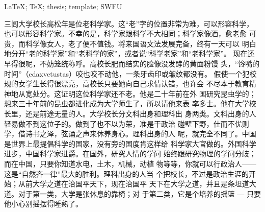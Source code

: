 \documentclass{swfuthesis}
\begin{document}
\begin{EKeyword} %
  \LaTeX{}; \TeX{}; thesis; template; SWFU
\end{EKeyword}

\vspace*{-60pt}
\tableofcontents %
\clearpage
\listoffigures %
\clearpage
\listoftables  %

\mainmatter






\appendix %

\makebib %

\begin{advisorInfo} %
  三闾大学校长高松年是位老科学家。这“老”字的位置非常为难，可以形容科学，
  也可以形容科学家。不幸的是，科学家跟科学不大相同；科学家像酒，愈老愈
  可贵，而科学像女人，老了便不值钱。将来国语文法发展完备，终有一天可以
  明白地分开“老的科学家”和“老科学的家”，或者说“科学老家”和“老科学家”。
  现在还早得很呢，不妨笼统称呼。高校长肥而结实的脸像没发酵的黄面粉馒
  头，“馋嘴的时间”（edaxvetustas）咬也咬不动他，一条牙齿印或皱纹都没有。
  假使一个犯校规的女学生长得很漂亮，高校长只要她向自己求情认错，也许会
  不尽本于教育精神地从宽处分。这证明这位科学家还不老。他是二十年前在外
  国研究昆虫学的；想来三十年前的昆虫都进化成为大学师生了，所以请他来表
  率多士。他在大学校长里，还是前途无量的人。大学校长分文科出身和理科出
  身两类。文科出身的人轻易做不到这位子的。做到了也不以为荣，准是干政治
  碰壁下野，仕而不优则学，借诗书之泽，弦诵之声来休养身心。理科出身的人
  呢，就完全不同了。中国是世界上最提倡科学的国家，没有旁的国度肯这样给
  科学家大官做的。外国科学进步，中国科学家进爵。在国外，研究人情的学问
  始终跟研究物理的学问分歧；而在中国，只要你知道水电，土木，机械，动植
  物等等，你就可以行政治人——这是“自然齐一律”最大的胜利。理科出身的人当
  个把校长，不过是政治生涯的开始；从前大学之道在治国平天下，现在治国平
  天下在大学之道，并且是条坦道大道。对于第一类，大学是张休息的靠椅；对
  于第二类，它是个培养的摇篮 --- 只要他小心别摇摆得睡熟了。


\end{advisorInfo}
\end{document}
